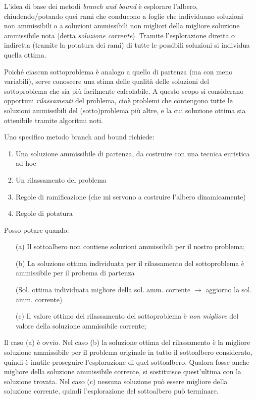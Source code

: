 \documentclass[a4paper,11pt]{book}
\theoremstyle{break}
\begin{document}
L'idea di base dei metodi \emph{branch and bound} è esplorare l'albero, chiudendo/potando quei rami che conducono a foglie che individuano soluzioni non ammissibili o a soluzioni ammissibili non migliori della migliore soluzione ammissibile nota (detta \emph{soluzione corrente}). Tramite l'esplorazione diretta o indiretta (tramite la potatura dei rami) di tutte le possibili soluzioni si individua quella ottima.\smallskip

Poiché ciascun sottoproblema è analogo a quello di partenza (ma con meno variabili), serve conoscere una stima delle qualità delle soluzioni del sottoproblema che sia più facilmente calcolabile. A questo scopo si considerano opportuni \emph{rilassamenti} del problema, cioè problemi che contengono tutte le soluzioni ammissibili del (sotto)problema più altre, e la cui soluzione ottima sia ottenibile tramite algoritmi noti.\smallskip

Uno specifico metodo branch and bound richiede:

\begin{enumerate}
 \item Una soluzione ammissibile di partenza, da costruire con una tecnica euristica ad hoc
 \item Un rilassamento del problema
 \item Regole di ramificazione (che mi servono a costruire l'albero dinamicamente)
 \item Regole di potatura
\end{enumerate}
Posso potare quando:
 \begin{enumerate}
  \item[(a)] Il sottoalbero non contiene soluzioni ammissibili per il nostro problema;
  \item[(b)] La soluzione ottima individuata per il rilassamento del sottoproblema è ammissibile per il probema di partenza
  
  (Sol. ottima individuata migliore della sol. amm. corrente $\to$ aggiorno la sol. amm. corrente)
  \item[(c)] Il valore ottimo del rilassamento del sottoproblema è \emph{non migliore} del valore della soluzione ammissibile corrente;
  
  
 \end{enumerate}
  
  Il caso (a) è ovvio. Nel caso (b) la soluzione ottima del rilassamento è la migliore soluzione ammissibile per il problema originale in tutto il sottoalbero considerato, quindi è inutile proseguire l'esplorazione di quel sottoalbero. Qualora fosse anche migliore della soluzione ammissibile corrente, si sostituisce quest'ultima con la soluzione trovata.  Nel caso (c) nessuna soluzione può essere migliore della soluzione corrente, quindi l'esplorazione del sottoalbero può terminare.\bigskip
\end{document}
